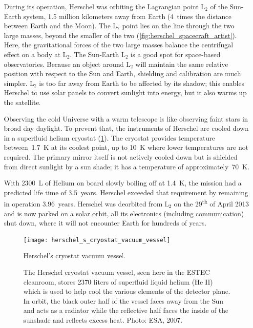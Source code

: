 During its operation, Herschel was orbiting the Lagrangian point $\text{L}_2$ of the Sun-Earth system, 1.5 million kilometers away from Earth (4~times the distance between Earth and the Moon).
The $\text{L}_2$ point lies on the line through the two large masses, beyond the smaller of the two (\cref{fig:herschel_spacecraft_artist}).
Here, the gravitational forces of the two large masses balance the centrifugal effect on a body at $\text{L}_2$.
The Sun-Earth $\text{L}_2$ is a good spot for space-based observatories.
Because an object around $\text{L}_2$ will maintain the same relative position with respect to the Sun and Earth, shielding and calibration are much simpler.
$\text{L}_2$ is too far away from Earth to be affected by its shadow;
this enables Herschel to use solar panels to convert sunlight into energy,
but it also warms up the satellite.

Observing the cold Universe with a warm telescope is like observing faint stars in broad day daylight.
To prevent that, the instruments of Herschel are cooled down in a superfluid helium cryostat (\cref{fig:photo_hifi_cryo}).
The cryostat provides temperature between~\SI{1.7}{\kelvin} at its coolest point, up to \SI{10}{\kelvin} where lower temperatures are not required.
The primary mirror itself is not actively cooled down but is shielded from direct sunlight by a sun shade; it has a temperature of approximately~\SI{70}{\kelvin}.

With \SI{2300}{\liter} of Helium on board slowly boiling off at \SI{1.4}{\kelvin}, the mission had a predicted life time of 3.5~years.
Herschel exceeded that requirement by remaining in operation 3.96~years.
Herschel was deorbited from $\text{L}_2$ on the 29\textsuperscript{th} of April 2013 and is now parked on a solar orbit, all its electronics (including communication) shut down, where it will not encounter Earth for hundreds of years.

\begin{figure}[hbtp]
    \centering
    \texttt{[image: herschel\_s\_cryostat\_vacuum\_vessel]}
    \caption{Herschel's cryostat vacuum vessel.}
    \caption*{The Herschel cryostat vacuum vessel, seen here in the ESTEC cleanroom, stores 2370 liters of superfluid liquid helium (He II) which is used to help cool the various elements of the detector plane. In orbit, the black outer half of the vessel faces away from the Sun and acts as a radiator while the reflective half faces the inside of the sunshade and reflects excess heat.  Photo: ESA, 2007.}
    \label{fig:photo_hifi_cryo}
\end{figure}

